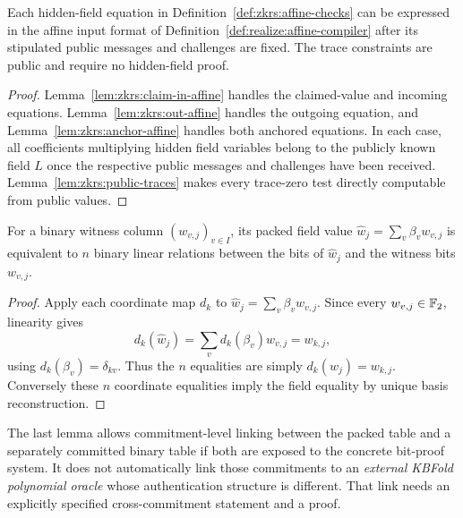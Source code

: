 \begin{lemma}\label{lem:realize:chapter9-affine}
Each hidden-field equation in
Definition~\ref{def:zkrs:affine-checks}
can be expressed in the affine input
format of Definition~\ref{def:realize:affine-compiler}
after its stipulated public messages
and challenges are fixed.
The trace constraints are public
and require no hidden-field proof.
\end{lemma}
\begin{proof}
Lemma~\ref{lem:zkrs:claim-in-affine}
handles the claimed-value and
incoming equations.
Lemma~\ref{lem:zkrs:out-affine}
handles the outgoing equation, and
Lemma~\ref{lem:zkrs:anchor-affine}
handles both anchored equations.
In each case, all coefficients multiplying
hidden field variables belong to the
publicly known field $L$ once the
respective public messages and
challenges have been received.
Lemma~\ref{lem:zkrs:public-traces}
makes every trace-zero test directly
computable from public values.
\end{proof}

\begin{lemma}\label{lem:realize:packing-link}
For a binary witness column $(w_{v,j})_{v\in I}$,
its packed field value
$\widehat w_j=\sum_v\beta_vw_{v,j}$
is equivalent to $n$ binary linear
relations between the bits of $\widehat w_j$
and the witness bits $w_{v,j}$.
\end{lemma}
\begin{proof}
Apply each coordinate map $d_k$ to
$\widehat w_j=\sum_v\beta_vw_{v,j}$.
Since every $w_{v,j}\in\mathbb{F}_2$,
linearity gives
\[
 d_k(\widehat w_j)
   =\sum_v d_k(\beta_v)w_{v,j}
   =w_{k,j},
\]
using $d_k(\beta_v)=\delta_{kv}$.
Thus the $n$ equalities are simply
$ d_k(\widehat w_j)=w_{k,j}$.
Conversely these $n$ coordinate
equalities imply the field equality
by unique basis reconstruction.
\end{proof}

\begin{remark}
The last lemma allows commitment-level linking
between the packed table and a separately
committed binary table if both are exposed to
the concrete bit-proof system. It does not
automatically link those commitments to an
\emph{external KBFold polynomial oracle}
whose authentication structure is different.
That link needs an explicitly specified
cross-commitment statement and a proof.
\end{remark}
